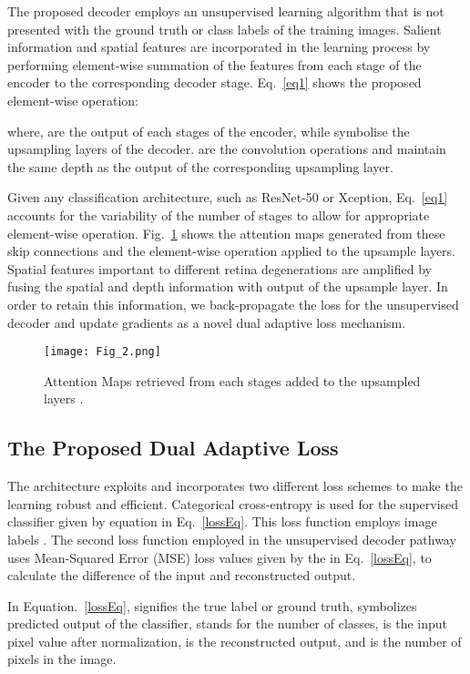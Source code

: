 \documentclass{article}
\begin{document}
The proposed decoder employs an unsupervised learning algorithm that is not presented with the ground truth or class labels of the training images. Salient information and spatial features are incorporated in the learning process by performing element-wise summation of the features from each stage of the encoder to the corresponding decoder stage. Eq.~\eqref{eq1} shows the proposed element-wise operation: 

where,  are the output of each stages of the encoder, while  symbolise the  upsampling layers of the decoder.  are the convolution operations and maintain the same depth as the output of the corresponding upsampling layer. 

Given any classification architecture, such as ResNet-50 or Xception, Eq.~\eqref{eq1} accounts for the variability of the number of stages to allow for appropriate element-wise operation. Fig.~\ref{attention_maps} shows the attention maps generated from these skip connections and the element-wise operation applied to the upsample layers. Spatial features important to different retina degenerations are amplified by fusing the spatial and depth information with output of the upsample layer. In order to retain this information, we back-propagate the loss for the unsupervised decoder and update gradients as a novel dual adaptive loss mechanism. 

\begin{figure}[htp]
    \centering
    \texttt{[image: Fig\_2.png]}
    \caption{Attention Maps retrieved from each stages  added to the upsampled layers .}\vspace{-.2in}
    \label{attention_maps}
\end{figure}

\subsection{The Proposed Dual Adaptive Loss}
The architecture exploits and incorporates two different loss schemes to make the learning robust and efficient. Categorical cross-entropy is used for the supervised classifier given by  equation in Eq.~\eqref{lossEq}. This loss function employs image labels . The second loss function employed in the unsupervised decoder pathway uses Mean-Squared Error (MSE) loss values given by the  in Eq.~\eqref{lossEq}, to calculate the difference of the input and reconstructed output.  



In Equation.~\eqref{lossEq},  signifies the true label or ground truth,  symbolizes predicted output of the classifier,  stands for the number of classes,  is the input pixel value after normalization,  is the reconstructed output, and  is the number of pixels in the image.  
\end{document}
